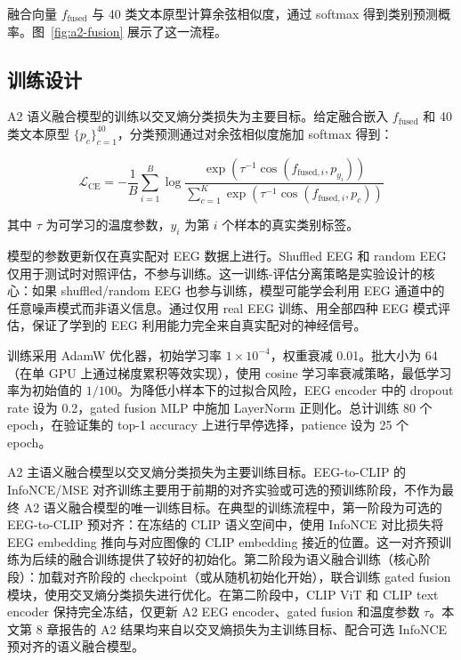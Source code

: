 融合向量 $f_{\mathrm{fused}}$ 与 40 类文本原型计算余弦相似度，通过 softmax 得到类别预测概率。图~\ref{fig:a2-fusion} 展示了这一流程。


\subsection{训练设计}

A2 语义融合模型的训练以交叉熵分类损失为主要目标。给定融合嵌入 $f_{\mathrm{fused}}$ 和 40 类文本原型 $\{p_c\}_{c=1}^{40}$，分类预测通过对余弦相似度施加 softmax 得到：

\begin{equation}
  \mathcal{L}_{\mathrm{CE}} = -\frac{1}{B} \sum_{i=1}^{B} \log \frac{\exp(\tau^{-1} \cos(f_{\mathrm{fused},i}, p_{y_i}))}{\sum_{c=1}^{K} \exp(\tau^{-1} \cos(f_{\mathrm{fused},i}, p_c))}
\end{equation}

其中 $\tau$ 为可学习的温度参数，$y_i$ 为第 $i$ 个样本的真实类别标签。

模型的参数更新仅在真实配对 EEG 数据上进行。Shuffled EEG 和 random EEG 仅用于测试时对照评估，不参与训练。这一训练-评估分离策略是实验设计的核心：如果 shuffled/random EEG 也参与训练，模型可能学会利用 EEG 通道中的任意噪声模式而非语义信息。通过仅用 real EEG 训练、用全部四种 EEG 模式评估，保证了学到的 EEG 利用能力完全来自真实配对的神经信号。

训练采用 AdamW 优化器，初始学习率 $1\times10^{-4}$，权重衰减 0.01。批大小为 64（在单 GPU 上通过梯度累积等效实现），使用 cosine 学习率衰减策略，最低学习率为初始值的 $1/100$。为降低小样本下的过拟合风险，EEG encoder 中的 dropout rate 设为 0.2，gated fusion MLP 中施加 LayerNorm 正则化。总计训练 80 个 epoch，在验证集的 top-1 accuracy 上进行早停选择，patience 设为 25 个 epoch。

A2 主语义融合模型以交叉熵分类损失为主要训练目标。EEG-to-CLIP 的 InfoNCE/MSE 对齐训练主要用于前期的对齐实验或可选的预训练阶段，不作为最终 A2 语义融合模型的唯一训练目标。在典型的训练流程中，第一阶段为可选的 EEG-to-CLIP 预对齐：在冻结的 CLIP 语义空间中，使用 InfoNCE 对比损失将 EEG embedding 推向与对应图像的 CLIP embedding 接近的位置。这一对齐预训练为后续的融合训练提供了较好的初始化。第二阶段为语义融合训练（核心阶段）：加载对齐阶段的 checkpoint（或从随机初始化开始），联合训练 gated fusion 模块，使用交叉熵分类损失进行优化。在第二阶段中，CLIP ViT 和 CLIP text encoder 保持完全冻结，仅更新 A2 EEG encoder、gated fusion 和温度参数 $\tau$。本文第 8 章报告的 A2 结果均来自以交叉熵损失为主训练目标、配合可选 InfoNCE 预对齐的语义融合模型。

